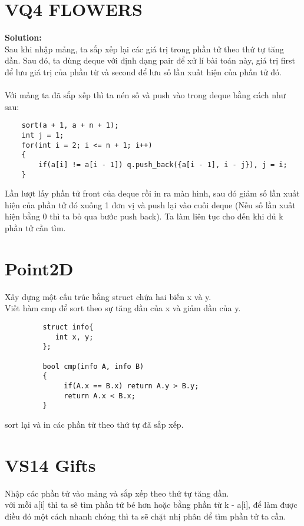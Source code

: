 \documentclass{article}
\begin{document}
\section*{VQ4 FLOWERS}

\textbf{Solution:} \\

Sau khi nhập mảng, ta sắp xếp lại các giá trị trong phần tử theo thứ tự tăng dần.
Sau đó, ta dùng deque với định dạng pair để xử lí bài toán này, giá trị first để lưu giá trị của phần từ  và second để lưu số lần xuất hiện của phần tử đó. \\ \\
Với mảng ta đã sắp xếp thì ta nén số và push vào trong deque bằng cách như sau:

\begin{verbatim}
    sort(a + 1, a + n + 1);
    int j = 1;
    for(int i = 2; i <= n + 1; i++)
    {
        if(a[i] != a[i - 1]) q.push_back({a[i - 1], i - j}), j = i;
    }
\end{verbatim}
Lần lượt lấy phần tử front của deque rồi in ra màn hình, sau đó giảm số lần xuất hiện của phần tử đó xuống 1 đơn vị và push lại vào cuối deque (Nếu số lần xuất hiện bằng 0 thì ta bỏ qua bước push back). Ta làm liên tục cho đến khi đủ k phần tử cần tìm.


\section*{Point2D}
Xây dựng một cấu trúc bằng struct chứa hai biến x và y. \\
Viết hàm cmp để sort theo sự tăng dần của x và giảm dần của y. \\

\begin{verbatim}
         struct info{
            int x, y;
         };

         bool cmp(info A, info B)
         {
              if(A.x == B.x) return A.y > B.y;
              return A.x < B.x;
         }
\end{verbatim}

sort lại và in các phần tử theo thứ tự đã sắp xếp.

\section*{VS14 Gifts}

Nhập các phần tử vào mảng và sắp xếp theo thứ tự tăng dần. \\ 
với mỗi a[i] thì ta sẽ tìm phần tử bé hơn hoặc bằng phần từ k - a[i], để làm được điều đó một cách nhanh chóng thì ta sẽ chặt nhị phân để tìm phần tử ta cần.
\end{document}
